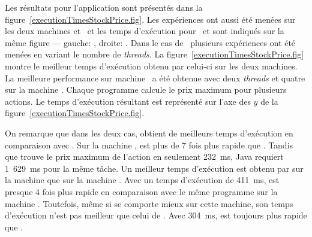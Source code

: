 


Les r\'esultats  pour l'application  sont pr\'esent\'es dans la figure~\ref{executionTimesStockPrice.fig}. Les expériences ont aussi \'et\'e menées sur les deux machines  et~ et les temps d'ex\'ecution pour \ppff\ et  sont indiqu\'es sur la m\^eme figure --- gauche: , droite: . 
%
Dans le cas de \ppff\, plusieurs exp\'eriences ont \'et\'e men\'ees en variant le nombre de \emph{threads}. La figure~\ref{executionTimesStockPrice.fig} montre le meilleur temps d'ex\'ecution obtenu par celui-ci sur les deux machines. La meilleure performance sur machine \ a \'et\'e obtenue avec deux \emph{threads} et quatre sur la machine .
%
Chaque programme calcule le prix maximum pour plusieurs actions. Le temps d'ex\'ecution r\'esultant est repr\'esent\'e sur l'axe des $y$ de la figure~\ref{executionTimesStockPrice.fig}. 

On remarque que dans les deux cas,  obtient de meilleurs temps d'ex\'ecution en comparaison avec . Sur la machine ,  est plus de 7 fois plus rapide que . Tandis que  trouve le prix maximum de l'action en seulement 232~ms, Java requiert 1~629~ms pour la m\^eme t\^ache. Un meilleur temps d'ex\'ecution est obtenu par  sur la machine  que sur la machine . Avec un temps d'ex\'ecution de 411~ms,  est presque 4 fois plus rapide en comparaison avec le m\^eme programme  sur la machine . Toutefois, m\^eme si  se comporte mieux sur cette machine, son temps d'ex\'ecution n'est pas meilleur que celui de . Avec 304~ms,  est toujours plus rapide que . 


